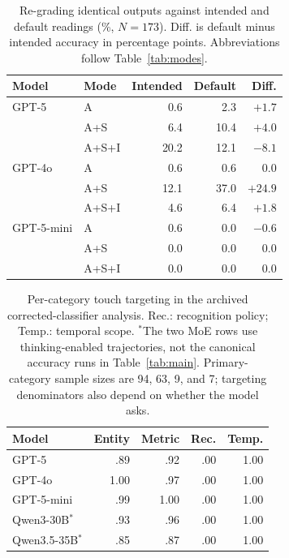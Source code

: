 \begin{table}[t]
\centering
\small
\begin{tabular}{@{}llrrr@{}}
\toprule
Model & Mode & Intended & Default & Diff. \\
\midrule
GPT-5 & A & 0.6 & 2.3 & $+1.7$ \\
 & A+S & 6.4 & 10.4 & $+4.0$ \\
 & A+S+I & 20.2 & 12.1 & $-8.1$ \\
\midrule
GPT-4o & A & 0.6 & 0.6 & $0.0$ \\
 & A+S & 12.1 & 37.0 & $+24.9$ \\
 & A+S+I & 4.6 & 6.4 & $+1.8$ \\
\midrule
GPT-5-mini & A & 0.6 & 0.0 & $-0.6$ \\
 & A+S & 0.0 & 0.0 & $0.0$ \\
 & A+S+I & 0.0 & 0.0 & $0.0$ \\
\bottomrule
\end{tabular}
\caption{Re-grading identical outputs against intended and default readings (\%, $N=173$). Diff. is default minus intended accuracy in percentage points. Abbreviations follow Table~\ref{tab:modes}.}
\label{tab:default}
\end{table}

\begin{table}[t]
\centering
\small
\begin{tabular}{@{}lrrrr@{}}
\toprule
Model & Entity & Metric & Rec. & Temp. \\
\midrule
GPT-5 & .89 & .92 & .00 & 1.00 \\
GPT-4o & 1.00 & .97 & .00 & 1.00 \\
GPT-5-mini & .99 & 1.00 & .00 & 1.00 \\
Qwen3-30B$^*$ & .93 & .96 & .00 & 1.00 \\
Qwen3.5-35B$^*$ & .85 & .87 & .00 & 1.00 \\
\bottomrule
\end{tabular}
\caption{Per-category touch targeting in the archived corrected-classifier analysis. Rec.: recognition policy; Temp.: temporal scope. $^*$The two MoE rows use thinking-enabled trajectories, not the canonical accuracy runs in Table~\ref{tab:main}. Primary-category sample sizes are 94, 63, 9, and 7; targeting denominators also depend on whether the model asks.}
\label{tab:category_targeting}
\end{table}
